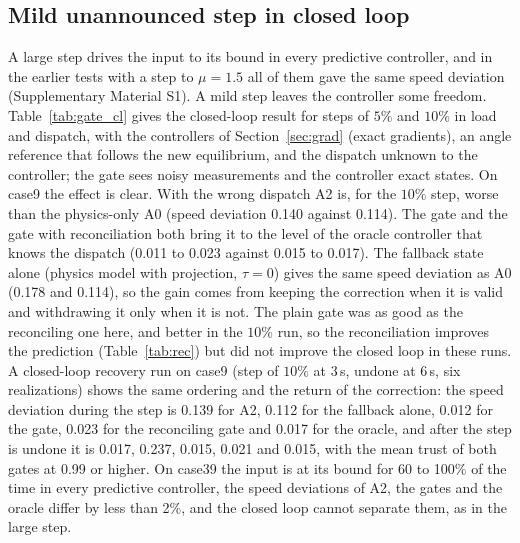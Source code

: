 \documentclass[preprint,12pt]{elsarticle}
\begin{document}
\subsection{Mild unannounced step in closed loop}
\label{sec:gate_cl}
A large step drives the input to its bound in every predictive controller, and in the earlier tests with a step to $\mu=1.5$ all of them gave the same speed deviation (Supplementary Material S1). A mild step leaves the controller some freedom. Table~\ref{tab:gate_cl} gives the closed-loop result for steps of $5\%$ and $10\%$ in load and dispatch, with the controllers of Section~\ref{sec:grad} (exact gradients), an angle reference that follows the new equilibrium, and the dispatch unknown to the controller; the gate sees noisy measurements and the controller exact states. On case9 the effect is clear. With the wrong dispatch A2 is, for the $10\%$ step, worse than the physics-only A0 (speed deviation 0.140 against 0.114). The gate and the gate with reconciliation both bring it to the level of the oracle controller that knows the dispatch (0.011 to 0.023 against 0.015 to 0.017). The fallback state alone (physics model with projection, $\tau=0$) gives the same speed deviation as A0 (0.178 and 0.114), so the gain comes from keeping the correction when it is valid and withdrawing it only when it is not. The plain gate was as good as the reconciling one here, and better in the $10\%$ run, so the reconciliation improves the prediction (Table~\ref{tab:rec}) but did not improve the closed loop in these runs. A closed-loop recovery run on case9 (step of $10\%$ at $3$\,s, undone at $6$\,s, six realizations) shows the same ordering and the return of the correction: the speed deviation during the step is 0.139 for A2, 0.112 for the fallback alone, 0.012 for the gate, 0.023 for the reconciling gate and 0.017 for the oracle, and after the step is undone it is 0.017, 0.237, 0.015, 0.021 and 0.015, with the mean trust of both gates at 0.99 or higher. On case39 the input is at its bound for 60 to 100\% of the time in every predictive controller, the speed deviations of A2, the gates and the oracle differ by less than 2\%, and the closed loop cannot separate them, as in the large step.
\end{document}
